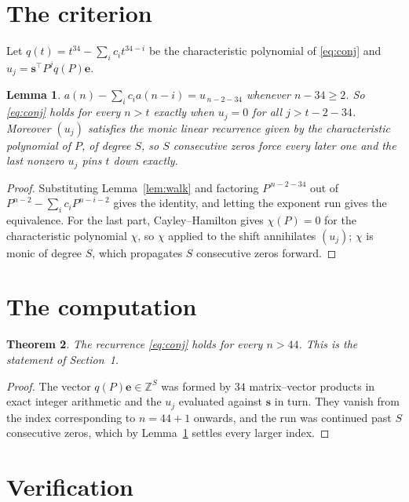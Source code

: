 \documentclass[11pt,a4paper]{article}
\theoremstyle{plain}
\newtheorem{theorem}{Theorem}
\newtheorem{lemma}[theorem]{Lemma}
\theoremstyle{definition}
\begin{document}
\section{The criterion}

Let $q(t)=t^{34}-\sum_i c_i t^{34-i}$ be the characteristic polynomial of
\eqref{eq:conj} and $u_j=\mathbf{s}^{\!\top}P^{j}q(P)\mathbf{e}$.

\begin{lemma}\label{lem:crit}
$a(n)-\sum_i c_i a(n-i)=u_{\,n-2-34}$ whenever $n-34\ge2$. So \eqref{eq:conj}
holds for every $n>t$ exactly when $u_j=0$ for all $j>t-2-34$. Moreover $(u_j)$
satisfies the monic linear recurrence given by the characteristic polynomial of $P$, of
degree $S$, so $S$ consecutive zeros force every later one and the last nonzero $u_j$ pins
$t$ down exactly.
\end{lemma}

\begin{proof}
Substituting Lemma~\ref{lem:walk} and factoring $P^{\,n-2-34}$ out of
$P^{n-2}-\sum_i c_i P^{n-i-2}$ gives the identity, and letting the exponent run gives the
equivalence. For the last part, Cayley--Hamilton gives $\chi(P)=0$ for the characteristic
polynomial $\chi$, so $\chi$ applied to the shift annihilates $(u_j)$; $\chi$ is monic of
degree $S$, which propagates $S$ consecutive zeros forward.
\end{proof}

\section{The computation}

\begin{theorem}
The recurrence \eqref{eq:conj} holds for every $n>44$. This is the statement of
Section~1.
\end{theorem}

\begin{proof}
The vector $q(P)\mathbf{e}\in\mathbb{Z}^{S}$ was formed by $34$ matrix--vector
products in exact integer arithmetic and the $u_j$ evaluated against $\mathbf{s}$ in turn.
They vanish from the index corresponding to $n=44+1$ onwards, and the run was continued
past $S$ consecutive zeros, which by Lemma~\ref{lem:crit} settles every larger index.
\end{proof}

\section{Verification}
\end{document}
